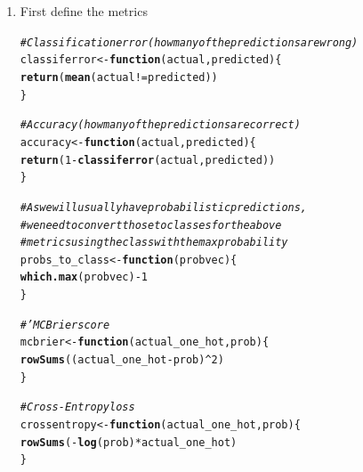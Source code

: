 \documentclass[a4paper]{article}
\makeatletter
\newcommand{\hlnum}[1]{\textcolor[rgb]{0.686,0.059,0.569}{#1}}%
\newcommand{\hlcom}[1]{\textcolor[rgb]{0.678,0.584,0.686}{\textit{#1}}}%
\newcommand{\hlopt}[1]{\textcolor[rgb]{0,0,0}{#1}}%
\newcommand{\hlstd}[1]{\textcolor[rgb]{0.345,0.345,0.345}{#1}}%
\newcommand{\hlkwa}[1]{\textcolor[rgb]{0.161,0.373,0.58}{\textbf{#1}}}%
\newcommand{\hlkwb}[1]{\textcolor[rgb]{0.69,0.353,0.396}{#1}}%
\newcommand{\hlkwc}[1]{\textcolor[rgb]{0.333,0.667,0.333}{#1}}%
\newcommand{\hlkwd}[1]{\textcolor[rgb]{0.737,0.353,0.396}{\textbf{#1}}}%
\newenvironment{kframe}{%
 \def\at@end@of@kframe{}%
 \ifinner\ifhmode%
  \def\at@end@of@kframe{\end{minipage}}%
  \begin{minipage}{\columnwidth}%
 \fi\fi%
 \def\FrameCommand##1{\hskip\@totalleftmargin \hskip-\fboxsep
 \colorbox{shadecolor}{##1}\hskip-\fboxsep
     \hskip-\linewidth \hskip-\@totalleftmargin \hskip\columnwidth}%
 \MakeFramed {\advance\hsize-\width
   \@totalleftmargin\z@ \linewidth\hsize
   \@setminipage}}%
 {\par\unskip\endMakeFramed%
 \at@end@of@kframe}
\newenvironment{knitrout}{}{} %
\makeatother
\begin{document}
{\begin{enumerate}
As both models de facto are based on neural networks (here the implementation of the softmax regression is actually done by fitting a neural network with the very same network structure), their similarity depends on how the network is trained. While clearly the implementation calling Python with backend \texttt{TensorFlow} (the \texttt{keras} fit) is much much faster, the network also converges more quickly due to a small batch size while the multinomial logistic regression calls a network fitting algorithm that uses batch size equal to the number of observations (which is usually a bad idea).

\item 

First define the metrics

\begin{knitrout}
\color{fgcolor}\begin{kframe}
\begin{alltt}
\hlcom{# Classification error (how many of the predictions are wrong)}
\hlstd{classiferror} \hlkwb{<-} \hlkwa{function}\hlstd{(}\hlkwc{actual}\hlstd{,} \hlkwc{predicted}\hlstd{) \{}
    \hlkwd{return}\hlstd{(}\hlkwd{mean}\hlstd{(actual} \hlopt{!=} \hlstd{predicted))}
\hlstd{\}}

\hlcom{# Accuracy (how many of the predictions are correct)}
\hlstd{accuracy} \hlkwb{<-} \hlkwa{function}\hlstd{(}\hlkwc{actual}\hlstd{,} \hlkwc{predicted}\hlstd{) \{}
    \hlkwd{return}\hlstd{(}\hlnum{1} \hlopt{-} \hlkwd{classiferror}\hlstd{(actual, predicted))}
\hlstd{\}}

\hlcom{# As we will usually have probabilistic predictions, }
\hlcom{# we need to convert those to classes for the above }
\hlcom{# metrics using the class with the max probability}
\hlstd{probs_to_class} \hlkwb{<-} \hlkwa{function}\hlstd{(}\hlkwc{probvec}\hlstd{) \{}
  \hlkwd{which.max}\hlstd{(probvec)}\hlopt{-}\hlnum{1}
\hlstd{\}}

\hlcom{#' MC Brier score}
\hlstd{mcbrier} \hlkwb{<-} \hlkwa{function}\hlstd{(}\hlkwc{actual_one_hot}\hlstd{,} \hlkwc{prob}\hlstd{) \{}
  \hlkwd{rowSums}\hlstd{((actual_one_hot}\hlopt{-}\hlstd{prob)}\hlopt{^}\hlnum{2}\hlstd{)}
\hlstd{\}}

\hlcom{# Cross-Entropy loss}
\hlstd{crossentropy} \hlkwb{<-} \hlkwa{function}\hlstd{(}\hlkwc{actual_one_hot}\hlstd{,} \hlkwc{prob}\hlstd{) \{}
  \hlkwd{rowSums}\hlstd{(} \hlopt{-}\hlkwd{log}\hlstd{(prob)} \hlopt{*} \hlstd{actual_one_hot )}
\hlstd{\}}


\end{alltt}
\end{kframe}
\end{knitrout}
\end{enumerate}}
\end{document}

